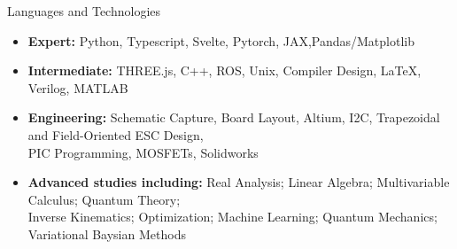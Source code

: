 \documentclass[]{mcdowellcv}
\begin{document}
\begin{cvsection}{Languages and Technologies}
	\begin{cvsubsection}{}{}{}
		\begin{itemize}
			\item \textbf{Expert:} Python, Typescript, Svelte, Pytorch, JAX,Pandas/Matplotlib
			\item \textbf{Intermediate:} THREE.js, C++, ROS, Unix, Compiler Design, LaTeX, Verilog, MATLAB
			\item \textbf{Engineering:} Schematic Capture, Board Layout, Altium, I2C,
			      Trapezoidal and Field-Oriented ESC Design, \\ PIC Programming, MOSFETs, Solidworks
			\item \textbf{Advanced studies including:} Real Analysis; Linear Algebra; Multivariable Calculus; Quantum Theory; \\ Inverse Kinematics; Optimization; Machine Learning; Quantum Mechanics; Variational Baysian Methods
		\end{itemize}
	\end{cvsubsection}
\end{cvsection}
\end{document}
